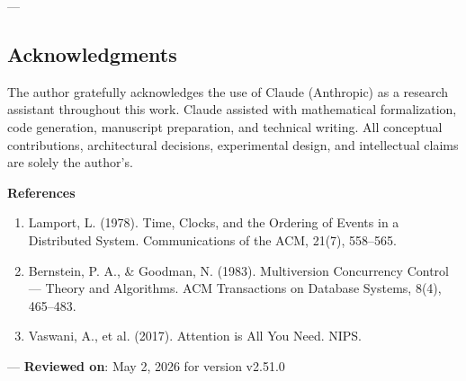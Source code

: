 ---
\subsection{Acknow\-ledgments}

The author gratefully ackno\-wledges the use of Claude (Anthropic) as a research assistant throughout this work. Claude assisted with mathe\-matical forma\-lization, code generation, manuscript preparation, and technical writing. All conceptual contr\-ibutions, archi\-tectural decisions, exper\-imental design, and intel\-lectual claims are solely the author's.

\textbf{References}
\begin{enumerate}
\item Lamport, L. (1978). Time, Clocks, and the Ordering of Events in a Distributed System. Commun\-ications of the ACM, 21(7), 558–565.
\item Bernstein, P. A., \& Goodman, N. (1983). Multiv\-ersion Concurrency Control — Theory and Algorithms. ACM Transa\-ctions on Database Systems, 8(4), 465–483.
\item Vaswani, A., et al. (2017). Attention is All You Need. NIPS.

\end{enumerate}
---
\textbf{Reviewed on}: May 2, 2026 for version v2.51.0
